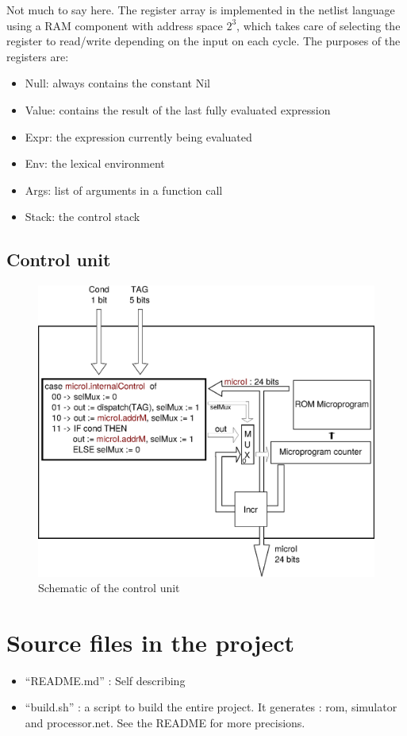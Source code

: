 \documentclass[a4paper, 11pt]{article}
\begin{document}
Not much to say here. The register array is implemented in the netlist language using a RAM component with address space $2^3$, which takes care of selecting the register to read/write depending on the input on each cycle. The purposes of the registers are:
\begin{itemize}
\item Null: always contains the constant Nil
\item Value: contains the result of the last fully evaluated expression
\item Expr: the expression currently being evaluated
\item Env: the lexical environment
\item Args: list of arguments in a function call
\item Stack: the control stack
\end{itemize}


\newpage
\subsection{Control unit}
\begin{figure}[h]
\center
\caption{Schematic of the control unit}
   \includegraphics[scale=0.5]{control.eps}
\end{figure}


\section{Source files in the project}
\begin{itemize}
\item \enquote{README.md} : Self describing
\item \enquote{build.sh} : a script to build the entire project. It generates : rom,
simulator and processor.net. See the README for more precisions.
\end{itemize}
\end{document}
